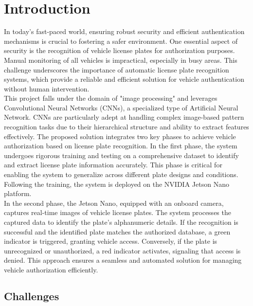 %
%
\chapter{Introduction}

In today's fast-paced world, ensuring robust security and efficient authentication mechanisms is crucial to fostering a safer environment. One essential aspect of security is the recognition of vehicle license plates for authorization purposes. Manual monitoring of all vehicles is impractical, especially in busy areas. This challenge underscores the importance of automatic license plate recognition systems, which provide a reliable and efficient solution for vehicle authentication without human intervention.\\

This project falls under the domain of "image processing" and leverages Convolutional Neural Networks (CNNs), a specialized type of Artificial Neural Network. CNNs are particularly adept at handling complex image-based pattern recognition tasks due to their hierarchical structure and ability to extract features effectively. The proposed solution integrates two key phases to achieve vehicle authorization based on license plate recognition. In the first phase, the system undergoes rigorous training and testing on a comprehensive dataset to identify and extract license plate information accurately. This phase is critical for enabling the system to generalize across different plate designs and conditions. Following the training, the system is deployed on the NVIDIA Jetson Nano platform.\\

In the second phase, the Jetson Nano, equipped with an onboard camera, captures real-time images of vehicle license plates. The system processes the captured data to identify the plate's alphanumeric details. If the recognition is successful and the identified plate matches the authorized database, a green indicator is triggered, granting vehicle access. Conversely, if the plate is unrecognized or unauthorized, a red indicator activates, signaling that access is denied. This approach ensures a seamless and automated solution for managing vehicle authorization efficiently.\cite{Sandha:2017}

\section{Challenges}

